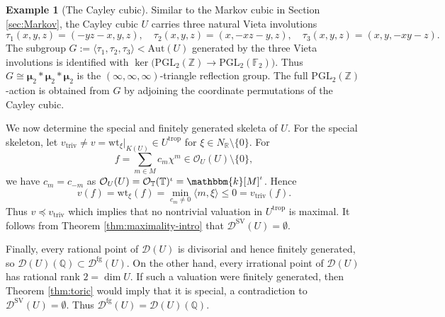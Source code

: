 \documentclass[reqno, 12pt]{amsart}
\theoremstyle{definition}
\newtheorem{expl}[prop]{Example}
\newcommand{\bP}{\mathbb{P}}
\newcommand{\bR}{\mathbb{R}}
\newcommand{\bQ}{\mathbb{Q}}
\newcommand{\bZ}{\mathbb{Z}}
\newcommand{\bT}{\mathbb{T}}
\newcommand{\bF}{\mathbb{F}}
\newcommand{\bk}{\mathbbm{k}}
\newcommand{\cO}{\mathcal{O}}
\newcommand{\cD}{\mathcal{D}}
\newcommand{\Aut}{\mathrm{Aut}}
\newcommand{\wt}{\mathrm{wt}}
\newcommand{\trop}{\mathrm{trop}}
\newcommand{\triv}{\mathrm{triv}}
\newcommand{\PGL}{\mathrm{PGL}}
\newcommand{\SV}{\mathrm{SV}}
\newcommand{\bmu}{\boldsymbol{\mu}}
\newcommand{\rfg}{\mathrm{fg}}
\numberwithin{equation}{section}
\newcommand{\YL}[1]{{\textcolor{blue}{[Yuchen: #1]}}}
\begin{document}
\begin{expl}[The Cayley cubic]
Similar to the Markov cubic in Section \ref{sec:Markov}, the Cayley cubic $U$ carries three natural Vieta involutions
\[
\tau_1(x,y,z)=(-yz-x,y,z),\quad
\tau_2(x,y,z)=(x,-xz-y,z),\quad
\tau_3(x,y,z)=(x,y,-xy-z).
\]
The subgroup
$G:=\langle \tau_1,\tau_2,\tau_3\rangle
< \Aut(U)$
generated by the three Vieta involutions
is identified with $\ker\bigl(\PGL_2(\bZ)\to\PGL_2(\bF_2)\bigr)$.
Thus $G\cong \bmu_2 *\bmu_2 * \bmu_2$ is the $(\infty,\infty,\infty)$-triangle reflection group. The full $\PGL_2(\bZ)$-action is obtained from $G$ by adjoining the
coordinate permutations of the Cayley cubic.

We now determine the special and finitely generated skeleta of $U$.
For the special skeleton, let $v_{\triv}\neq v = \wt_{\xi}|_{K(U)} \in U^{\trop}$ for $\xi\in N_{\bR}\setminus \{0\}$. For
\[
f=\sum_{m\in M}c_m\chi^m\in\cO_U(U)\setminus \{0\},
\]
we have $c_m=c_{-m}$ as $\cO_U(U) = \cO_{\bT}(\bT)^{\iota} = \bk[M]^{\iota}$. Hence
\[
v(f) = \wt_{\xi}(f) = \min_{c_m\neq0}\langle m,\xi\rangle
\leq 0 = v_{\triv}(f).
\]
Thus $v\preceq v_{\triv}$ which implies that no nontrivial valuation in $U^{\trop}$
is maximal. It follows from Theorem \ref{thm:maximality-intro} that $\cD^{\SV}(U)=\emptyset$.

Finally, every rational point of $\cD(U)$ is divisorial and hence finitely generated, so
$\cD(U)(\bQ)\subset \cD^{\rfg}(U)$.
On the other hand, every irrational point of $\cD(U)$ has rational rank
$2=\dim U$. If such a valuation were
finitely generated, then Theorem \ref{thm:toric} would imply that it is special, a contradiction to $\cD^{\SV}(U)=\emptyset$. Thus
$\cD^{\rfg}(U)=\cD(U)(\bQ)$.
\end{expl}




\end{document}
